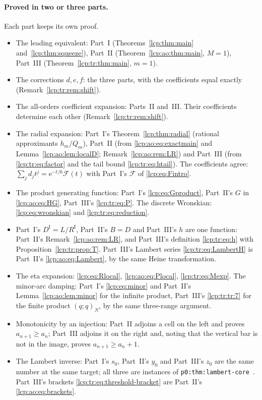 \documentclass[11pt]{article}
\numberwithin{equation}{section}
\theoremstyle{definition}\newtheorem{definition}[theorem]{Definition}
\theoremstyle{remark}\newtheorem{remark}[theorem]{Remark}
\newcommand{\ee}{\mathrm e}
\begin{document}
\paragraph{Proved in two or three parts.} Each part keeps its own proof.
\begin{itemize}[leftmargin=*,itemsep=0.15em]
\item The leading equivalent: Part~I (Theorems~\ref{lcp:thm:main}
 and~\ref{lcp:thm:squeeze}), Part~II (Theorem~\ref{lcp:ao:thm:main},
 $M=1$), Part~III (Theorem~\ref{lcp:tr:thm:main}, $m=1$).
\item The corrections $d,e,f$: the three parts, with the coefficients
 equal exactly (Remark~\ref{lcp:tr:rem:shift}).
\item The all-orders coefficient expansion: Parts~II and~III. Their
 coefficients determine each other (Remark~\ref{lcp:tr:rem:shift}).
\item The radial expansion: Part~I's Theorem~\ref{lcp:thm:radial} (rational
 approximants $h_m/Q_m$), Part~II (from \eqref{lcp:ao:eq:exactmain} and
 Lemma~\ref{lcp:ao:lem:localD}; Remark~\ref{lcp:ao:rem:LR}) and Part~III
 (from \eqref{lcp:tr:eq:factor} and the tail bound \eqref{lcp:tr:eq:htail}).
 The coefficients agree: $\sum_jd_jt^j=\ee^{-t/6}\mathcal F(t)$ with
 Part~I's $\mathcal F$ of \eqref{lcp:eq:Fintro}.
\item The product generating function: Part~I's \eqref{lcp:eq:Gproduct},
 Part~II's $G$ in \eqref{lcp:ao:eq:HG}, Part~III's \eqref{lcp:tr:eq:P}.
 The discrete Wronskian: \eqref{lcp:eq:wronskian} and
 \eqref{lcp:tr:eq:reduction}.
\item Part~I's $D^{\mathrm I}=L/R^{\mathrm I}$, Part~II's $B=D$ and Part~III's
 $h$ are one function: Part~II's Remark~\ref{lcp:ao:rem:LR}, and
 Part~III's definition \eqref{lcp:tr:eq:h} with
 Proposition~\ref{lcp:tr:prop:T}. Part~III's Lambert series
 \eqref{lcp:tr:eq:LambertH} is Part~II's \eqref{lcp:ao:eq:Lambert}, by the
 same Heine transformation.
\item The eta expansion: \eqref{lcp:eq:Rlocal}, \eqref{lcp:ao:eq:Plocal},
 \eqref{lcp:tr:eq:Mexp}. The minor-arc damping: Part~I's \eqref{lcp:eq:minor}
 and Part~II's Lemma~\ref{lcp:ao:lem:minor} for the infinite product,
 Part~III's \eqref{lcp:tr:tr:7} for the finite product $(q;q)_N$, by the
 same three-range argument.
\item Monotonicity by an injection: Part~II adjoins a cell on the left and
 proves $a_{n+1}\ge a_n$; Part~III adjoins it on the right and, noting
 that the vertical bar is not in the image, proves $a_{n+1}\ge a_n+1$.
\item The Lambert inverse: Part~I's $s_0$, Part~II's $y_0$ and Part~III's
 $z_0$ are the same number at the same target; all three are instances of
 \texttt{p0:thm:lambert-core}~\cite{lcp-tai}. Part~III's brackets
 \eqref{lcp:tr:eq:threshold-bracket} are Part~II's
 \eqref{lcp:ao:eq:brackets}.
\end{itemize}
\end{document}
